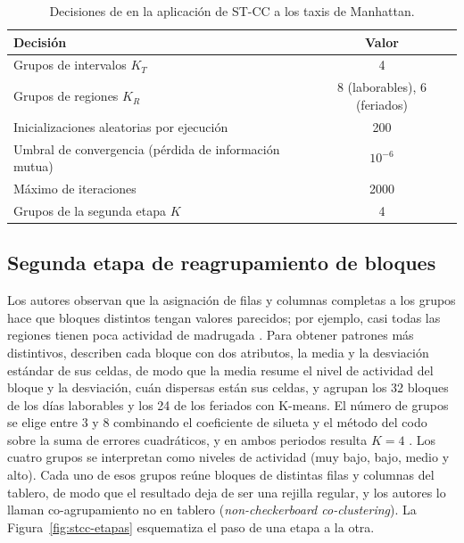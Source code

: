 \begin{table}[ht]
  \centering
  {\footnotesize
  \renewcommand{\arraystretch}{1.4}
  \begin{tabular}{@{}lc@{}}
    \toprule
    \textbf{Decisión} & \textbf{Valor} \\
    \midrule
    Grupos de intervalos $K_T$ & 4 \\
    \midrule
    Grupos de regiones $K_R$ & 8 (laborables), 6 (feriados) \\
    \midrule
    Inicializaciones aleatorias por ejecución & 200 \\
    \midrule
    Umbral de convergencia (pérdida de información mutua) & $10^{-6}$ \\
    \midrule
    Máximo de iteraciones & 2000 \\
    \midrule
    Grupos de la segunda etapa $K$ & 4 \\
    \bottomrule
  \end{tabular}
  }
  \caption{Decisiones de \citet{Liu2021} en la aplicación de ST-CC a los taxis de
  Manhattan.}
  \label{tab:liu-decisiones}
\end{table}

\subsection{Segunda etapa de reagrupamiento de bloques}

Los autores observan que la asignación de filas y columnas completas a los grupos
hace que bloques distintos tengan valores parecidos; por ejemplo, casi todas las
regiones tienen poca actividad de madrugada \citep[Sec.~III.B]{Liu2021}. Para
obtener patrones más distintivos, describen cada bloque con dos atributos, la
media y la desviación estándar de sus celdas, de modo que la media resume el nivel
de actividad del bloque y la desviación, cuán dispersas están sus celdas, y agrupan
los 32 bloques de los días laborables y los 24 de los feriados con
K-means. El número de
grupos se elige entre 3 y 8 combinando el coeficiente de silueta
\citep{Rousseeuw1987} y el método del codo sobre la suma de errores cuadráticos,
y en ambos periodos resulta $K = 4$ \citep[Sec.~IV.D]{Liu2021}. Los cuatro grupos
se interpretan como niveles de actividad (muy bajo, bajo, medio y alto). Cada uno
de esos grupos reúne bloques de distintas filas y columnas del tablero, de modo
que el resultado deja de ser una rejilla regular, y los autores lo llaman
co-agrupamiento no en tablero (\emph{non-checkerboard co-clustering}).
La Figura~\ref{fig:stcc-etapas} esquematiza el paso de una etapa a la otra.

